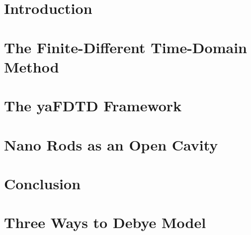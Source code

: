 \documentclass[openany]{book}
\begin{document}
\fontsize{12}{2.0em}\selectfont


\frontmatter




\tableofcontents





\mainmatter

\chapter{Introduction}




\chapter{The Finite-Different Time-Domain Method}







\chapter{The yaFDTD Framework}





\chapter{Nano Rods as an Open Cavity}


\chapter{Conclusion}



\appendix

\chapter{Three Ways to Debye Model}



\backmatter


\end{document}
